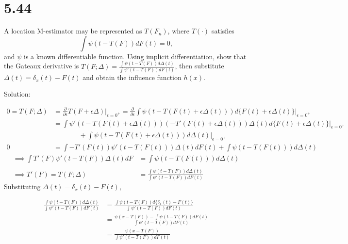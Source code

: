 \documentclass[
  letterpaper,
  DIV=11,
  numbers=noendperiod]{scrreprt}
\begin{document}
\newpage

\hypertarget{section-37}{%
\section{5.44}\label{section-37}}

A location M-estimator may be represented as \(T(F_n)\), where
\(T(\cdot)\) satisfies \[\int \psi (t- T(F)) d F(t) = 0,\] and \(\psi\)
is a known differentiable function. Using implicit differentiation, show
that the Gateaux derivative is
\(T(F;\Delta) = \frac{\int \psi (t- T(F))d\Delta(t)}{\int \psi' (t- T(F))dF(t)}\),
then substitute \(\Delta(t) = \delta_x (t) - F(t)\) and obtain the
influence function \(h(x)\).

Solution:

\[
\begin{aligned}
0=T(F;\Delta)  &= \frac{\partial}{\partial \epsilon} T(F+\epsilon \Delta) \bigg|_{\epsilon = 0^+}=\frac{\partial}{\partial \epsilon} \int \psi (t- T(F(t)+\epsilon \Delta(t))) d \{F(t)+\epsilon \Delta(t) \}  \bigg|_{\epsilon = 0^+}\\
&=\int \psi' (t- T(F(t)+\epsilon \Delta(t)))\left(-T'(F(t)+\epsilon \Delta(t))\right)\Delta(t)d \{F(t)+\epsilon \Delta(t) \}  \bigg|_{\epsilon = 0^+}\\ 
&~~~~~~~~~~~~~~~~~+\int \psi (t- T(F(t)+\epsilon \Delta(t)))d \Delta(t)  \bigg|_{\epsilon = 0^+}\\
0&=\int -T'(F(t))\psi' (t- T(F(t)))\Delta(t)dF(t)  +\int \psi (t- T(F(t)))d \Delta(t)
\end{aligned}
\] \[
\begin{aligned}
\implies \int T'(F)\psi' (t- T(F))\Delta(t)dF&= \int \psi (t- T(F(t)))d \Delta(t)\\
\\
\implies T'(F) = T(F; \Delta) &= \frac{\int \psi (t- T(F))d\Delta(t)}{\int \psi' (t- T(F))dF(t)}
\end{aligned}
\] Substituting \(\Delta(t) = \delta_x (t) - F(t)\),

\[
\begin{aligned}
\frac{\int \psi (t- T(F))d\Delta(t)}{\int \psi' (t- T(F))dF(t)} &= \frac{\int \psi (t- T(F))d\{\delta_x (t) - F(t)\}}{\int \psi' (t- T(F))dF(t)} \\
&= \frac{\psi (x- T(F)) - \int \psi (t- T(F))dF(t)}{\int \psi' (t- T(F))dF(t)} \\
&= \frac{\psi (x- T(F))}{\int \psi' (t- T(F))dF(t)} \\
\end{aligned}
\]
\end{document}
